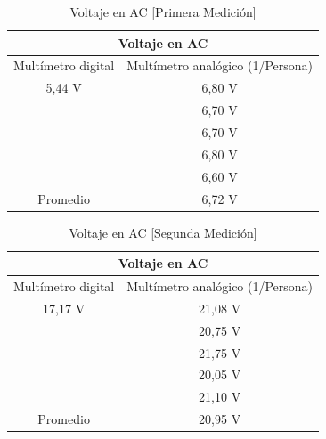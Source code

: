 \documentclass[letterpaper, 12pt]{report}
\begin{document}
\begin{table}[H]
	\begin{center}
		\begin{tabular}{|c|c|}
			\multicolumn{2}{c}{Voltaje en AC}                     \\ \hline
			Multímetro digital & Multímetro analógico (1/Persona) \\ \hline
			5,44 V             & 6,80 V                           \\
			                   & 6,70 V                           \\
			                   & 6,70 V                           \\
			                   & 6,80 V                           \\
			                   & 6,60 V                           \\ \hline
			Promedio           & 6,72 V                           \\ \hline
		\end{tabular}
		\caption{Voltaje en AC [Primera Medición]}
		\label{tab:voltajeAC_1}
	\end{center}
\end{table}

\begin{table}[H]
	\begin{center}
		\begin{tabular}{|c|c|}
			\multicolumn{2}{c}{Voltaje en AC}                     \\ \hline
			Multímetro digital & Multímetro analógico (1/Persona) \\ \hline
			17,17 V            & 21,08 V                          \\
			                   & 20,75 V                          \\
			                   & 21,75 V                          \\
			                   & 20,05 V                          \\
			                   & 21,10 V                          \\ \hline
			Promedio           & 20,95 V                          \\ \hline
		\end{tabular}
		\caption{Voltaje en AC [Segunda Medición]}
		\label{tab:voltajeAC_2}
	\end{center}
\end{table}
\end{document}
